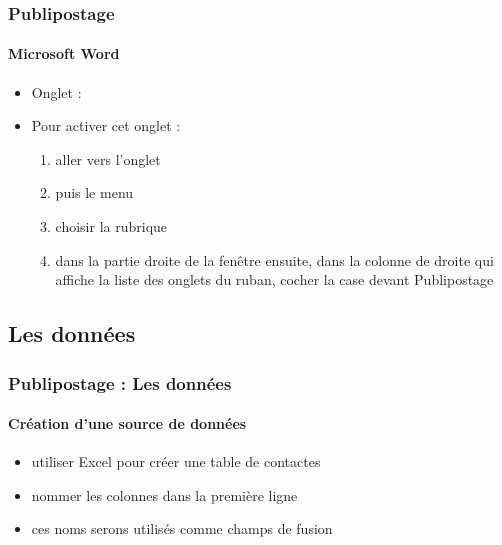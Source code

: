 \documentclass[xcolor=table]{beamer}
\begin{document}
\begin{frame}
\frametitle{Publipostage}
\framesubtitle{Microsoft Word}
 
\begin{itemize}
	\item Onglet : 
	\item Pour activer cet onglet : 
	\begin{enumerate}
		\item aller vers l'onglet 
		\item puis le menu 
		\item choisir la rubrique 
		\item dans la partie droite de la fenêtre ensuite, dans la colonne de droite qui affiche la liste des onglets du ruban, cocher la case devant Publipostage
	\end{enumerate}
\end{itemize}



\end{frame}

\subsection{Les données}

\begin{frame}
\frametitle{Publipostage : Les données}
\framesubtitle{Création d'une source de données}

\begin{minipage}{0.40\textwidth}
	\begin{itemize}
		\item utiliser Excel pour créer une table de contactes
		\item nommer les colonnes dans la première ligne
		\item ces noms serons utilisés comme champs de fusion
	\end{itemize}
\end{minipage}
\begin{minipage}{0.59\textwidth}
\end{minipage}

\end{frame}
\end{document}
